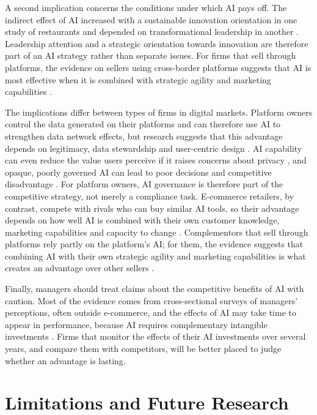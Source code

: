 A second implication concerns the conditions under which AI pays off. The indirect effect of AI increased with a sustainable innovation orientation in one study of restaurants \parencite{texeira2026} and depended on transformational leadership in another \parencite{sofiyan2026}. Leadership attention and a strategic orientation towards innovation are therefore part of an AI strategy rather than separate issues. For firms that sell through platforms, the evidence on sellers using cross-border platforms suggests that AI is most effective when it is combined with strategic agility and marketing capabilities \parencite{guo2025}.

The implications differ between types of firms in digital markets. Platform owners control the data generated on their platforms and can therefore use AI to strengthen data network effects, but research suggests that this advantage depends on legitimacy, data stewardship and user-centric design \parencite{gregory2021}. AI capability can even reduce the value users perceive if it raises concerns about privacy \parencite{yu2026}, and opaque, poorly governed AI can lead to poor decisions and competitive disadvantage \parencite{rana2022}. For platform owners, AI governance is therefore part of the competitive strategy, not merely a compliance task. E-commerce retailers, by contrast, compete with rivals who can buy similar AI tools, so their advantage depends on how well AI is combined with their own customer knowledge, marketing capabilities and capacity to change \parencite{noor2026, bunea2026}. Complementors that sell through platforms rely partly on the platform's AI; for them, the evidence suggests that combining AI with their own strategic agility and marketing capabilities is what creates an advantage over other sellers \parencite{guo2025}.

Finally, managers should treat claims about the competitive benefits of AI with caution. Most of the evidence comes from cross-sectional surveys of managers' perceptions, often outside e-commerce, and the effects of AI may take time to appear in performance, because AI requires complementary intangible investments \parencite{brynjolfsson2021}. Firms that monitor the effects of their AI investments over several years, and compare them with competitors, will be better placed to judge whether an advantage is lasting.

\section{Limitations and Future Research}
\label{sec:futurelimits}

